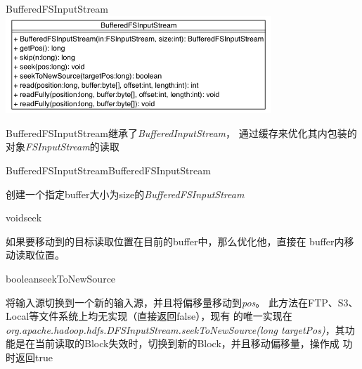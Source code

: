 \begin{XeClass}{BufferedFSInputStream}
\includegraphics[width=10cm]{cdig/BufferedFSInputStream.png}
     
 BufferedFSInputStream继承了\emph{BufferedInputStream}，
 通过缓存来优化其内包装的对象\emph{FSInputStream}的读取

    \begin{XeMethod}{\XePublic}{BufferedFSInputStream}{BufferedFSInputStream}
         
 创建一个指定buffer大小为size的\emph{BufferedFSInputStream}

    \end{XeMethod}

    \begin{XeMethod}{\XePublic}{void}{seek}
         
 如果要移动到的目标读取位置在目前的buffer中，那么优化他，直接在
 buffer内移动读取位置。

    \end{XeMethod}

    \begin{XeMethod}{\XePublic}{boolean}{seekToNewSource}
         
 将输入源切换到一个新的输入源，并且将偏移量移动到\emph{pos}。
 此方法在FTP、S3、Local等文件系统上均无实现（直接返回false），现有
 的唯一实现在\emph{org.apache.hadoop.hdfs.DFSInputStream.seekToNewSource(long targetPos)}，其功能是在当前读取的Block失效时，切换到新的Block，并且移动偏移量，操作成
 功时返回true

    \end{XeMethod}

\end{XeClass}
